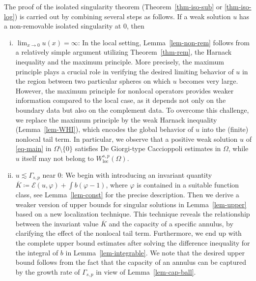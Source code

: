 \documentclass[11pt]{amsart}
\theoremstyle{plain}
\theoremstyle{definition}
\numberwithin{equation}{section}
\begin{document}
 The proof of the isolated singularity theorem (Theorem~\ref{thm-iso-sub} or \ref{thm-iso-log}) is carried out by combining several steps as follows. If a weak solution $u$ has a non-removable isolated singularity at $0$, then
	\begin{enumerate}[(i)]
		\item $\lim_{x \to 0}u(x)=\infty$: In the local setting, Lemma~\ref{lem-non-rem} follows from a relatively simple argument utilizing Theorem~\ref{thm-rem}, the Harnack inequality and the maximum principle. More precisely, the maximum principle plays a crucial role in verifying the desired limiting behavior of $u$ in the region between two particular spheres on which $u$ becomes very large. However, the maximum principle for nonlocal operators provides weaker information compared to the local case, as it depends not only on the boundary data but also on the complement data. To overcome this challenge, we replace the maximum principle by the weak Harnack inequality (Lemma~\ref{lem-WHI}), which encodes the global behavior of $u$ into the (finite) nonlocal tail term. In particular, we observe that a positive weak solution $u$ of \eqref{eq-main} in $\Omega \setminus \{0\}$ satisfies De Giorgi-type Caccioppoli estimates in $\Omega$, while $u$ itself may not belong to $W^{s, p}_{\mathrm{loc}}(\Omega)$. 
  
		\item $u \lesssim \Gamma_{s,p}$ near $0$: We begin with introducing an invariant quantity $\overline{K}\coloneqq \mathcal{E}(u, \varphi)+\int b(\varphi-1)$, where $\varphi$ is contained in a suitable function class, see Lemma~\ref{lem-const} for the precise description. Then we derive a weaker version of upper bounds for singular solutions in Lemma~\ref{lem-upper} based on a new localization technique. This technique reveals the relationship between the invariant value $\overline{K}$ and the capacity of a specific annulus, by clarifying the effect of the nonlocal tail term. Furthermore, we end up with the complete upper bound estimates after solving the difference inequality for the integral of $b$ in Lemma~\ref{lem-integrable}. We note that the desired upper bound follows from the fact that the capacity of an annulus can be captured by the growth rate of $\Gamma_{s,p}$ in view of Lemma~\ref{lem-cap-ball}.


\end{enumerate}
\end{document}
